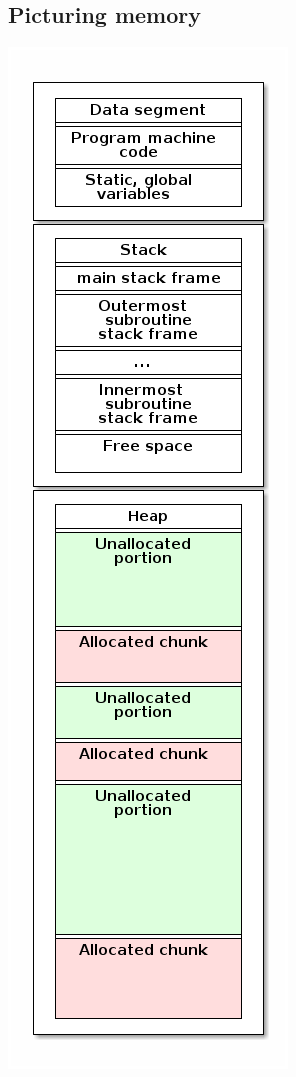 \documentclass[11pt]{article}
\theoremstyle{definition}
\begin{document}
\subsection{Picturing memory}
\label{sec:orgcf7f7c0}
\begin{center}
\includegraphics[width=\textwidth]{media/data-segment-stack-heap.png}
\end{center}
\end{document}
